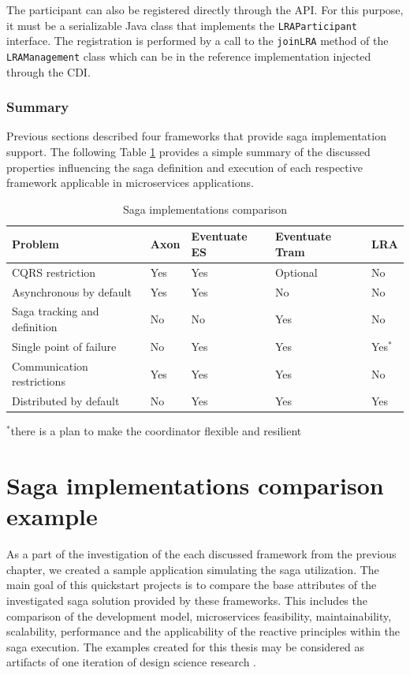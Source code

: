 \documentclass[oneside,
  digital, %
  table,   %
  lof,     %
  lot,     %
]{fithesis3}
\begin{document}
The participant can also be registered directly through the API. For this purpose, it must be a serializable Java class that implements the \texttt{LRAParticipant} interface. The registration is performed by a call to the \texttt{joinLRA} method of the \texttt{LRAManagement} class which can be in the reference implementation injected through the CDI.

\subsection{Summary}

Previous sections described four frameworks that provide saga implementation support. The following Table \ref{tab:saga-implementations-comparison} provides a simple summary of the discussed properties influencing the saga definition and execution of each respective framework applicable in microservices applications. 

\begin{table}[ht]
    \begin{tabularx}{\textwidth}{p{4cm}XXXX}
        \toprule
        Problem & Axon & Eventuate ES & Eventuate Tram & LRA\\
        \midrule
        CQRS restriction & Yes & Yes & Optional & No \\
        Asynchronous by \newline default & Yes & Yes & No & No \\
        Saga tracking and \newline definition & No & No & Yes & No\\
        Single point of failure & No & Yes & Yes & Yes$^*$\\
        Communication restrictions & Yes & Yes & Yes & No\\
        Distributed by default & No & Yes & Yes & Yes\\
        \bottomrule
    \end{tabularx}
    \caption{Saga implementations comparison}
    \label{tab:saga-implementations-comparison}
    \bigskip
    $^*$there is a plan to make the coordinator flexible and resilient
\end{table}



\clearpage
\chapter{Saga implementations comparison example}

As a part of the investigation of the each discussed framework from the previous chapter, we created a sample application simulating the saga utilization. The main goal of this quickstart projects is to compare the base attributes of the investigated saga solution provided by these frameworks. This includes the comparison of the development model, microservices feasibility, maintainability, scalability, performance and the applicability of the reactive principles within the saga execution. The examples created for this thesis may be considered as artifacts of one iteration of design science research \cite{design_science}.
\end{document}
